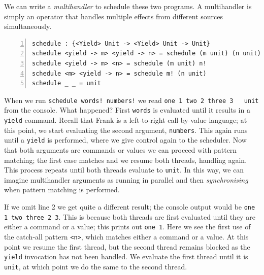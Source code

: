\documentclass[msc,deptreport,cs]{infthesis} %
\newcommand{\code}[1]{\lstinline{#1}}
\begin{document}
We can write a \emph{multihandler} to schedule these two programs. A
multihandler is simply an operator that handles multiple effects from different
sources simultaneously.

\begin{lstlisting}[numbers=left]
schedule : {<Yield> Unit -> <Yield> Unit -> Unit}
schedule <yield -> m> <yield -> n> = schedule (m unit) (n unit)
schedule <yield -> m> <n> = schedule (m unit) n!
schedule <m> <yield -> n> = schedule m! (n unit)
schedule _ _ = unit
\end{lstlisting}

When we run \code{schedule words! numbers!} we read \code{one 1 two 2 three 3
  unit} from the console. What happened? First \code{words} is evaluated until
it results in a \code{yield} command. Recall that Frank is a left-to-right
call-by-value language; at this point, we start evaluating the second argument,
\code{numbers}. This again runs until a \code{yield} is performed, where we give
control again to the scheduler. Now that both arguments are commands or values
we can proceed with pattern matching; the first case matches and we resume both
threads, handling again. This process repeats until both threads evaluate to
\code{unit}. In this way, we can imagine multihandler arguments as running in
parallel and then \emph{synchronising} when pattern matching is performed.

If we omit line 2 we get quite a different result; the console output would be
\code{one 1 two three 2 3}. This is because both threads are first evaluated
until they are either a command or a value; this prints out \code{one 1}. Here
we see the first use of the catch-all pattern \code{<n>}, which matches either a
command or a value. At this point we resume the first thread, but the second
thread remains blocked as the \code{yield} invocation has not been handled. We
evaluate the first thread until it is \code{unit}, at which point we do the same
to the second thread.

\end{document}
